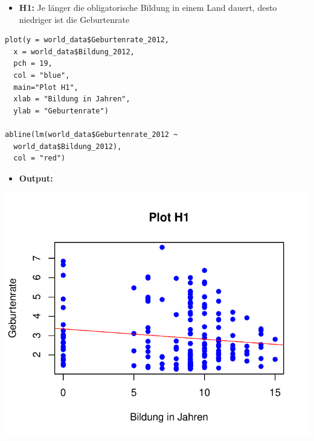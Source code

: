 \documentclass[aspectratio=169, journal, x11names, unknownkeysallowed, hyperref={colorlinks,
linkcolor = SS2,
urlcolor  = F3,
citecolor = F3,
anchorcolor = A4}, 12pt]{beamer}
\begin{document}
  \begin{frame}[t, fragile]
    \begin{minipage}[t]{0.45\textwidth}
        \begin{itemize}
            \item[] \textbf{H1:} Je länger die obligatorische Bildung in einem Land dauert, desto niedriger ist die Geburtenrate
          \end{itemize}
\begin{lstlisting}
plot(y = world_data$Geburtenrate_2012, 
  x = world_data$Bildung_2012, 
  pch = 19, 
  col = "blue", 
  main="Plot H1", 
  xlab = "Bildung in Jahren", 
  ylab = "Geburtenrate")

abline(lm(world_data$Geburtenrate_2012 ~ 
  world_data$Bildung_2012), 
  col = "red")
\end{lstlisting} 
      \end{minipage}
      \begin{minipage}[t]{0.45\textwidth}
        \begin{itemize}
          \item[] \textbf{Output:}
        \end{itemize}

        \begin{center}
          \includegraphics[scale=0.5]{../Plots/plot_H1.pdf}
        \end{center}
      \end{minipage}
  \end{frame}
\end{document}
